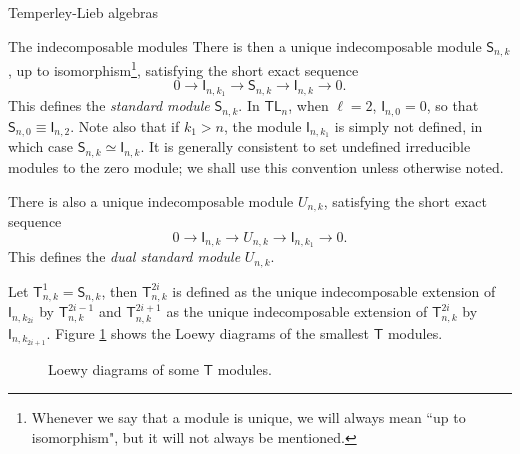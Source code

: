 \documentclass[reqno]{amsart}
\newcommand{\tl}[1]{\mathsf{TL}_{#1}}
\newcommand{\ds}[1]{\mathsf S_{#1}}
\newcommand{\dl}[1]{\mathsf I_{#1}}
\newcommand{\U}[1]{U_{#1}}
\newcommand{\T}[2]{\mathsf{T}^{#1}_{#2}}
\begin{document}
\begin{section}{Temperley-Lieb algebras}
\begin{subsection}{The indecomposable modules}
There is then a unique indecomposable module $\ds{n,k}$, up to isomorphism\footnote{Whenever we say that a module is unique, we will always mean ``up to isomorphism", but it will not always be mentioned.}, satisfying the short exact sequence
\begin{equation}
0 \longrightarrow \dl{n,k_{1}} \longrightarrow \ds{n,k} \longrightarrow \dl{n,k} \longrightarrow 0.
\end{equation} 
This defines the \emph{standard module} $\ds{n,k}$. In $\tl{n}$, when $\ell =2$, $\dl{n,0}=0$, so that $\ds{n,0}\equiv \dl{n,2}$. Note also that if $k_{1}>n$, the module $\dl{n,k_{1}}$ is simply not defined, in which case $\ds{n,k} \simeq \dl{n,k}$. It is generally consistent to set undefined irreducible modules to the zero module; we shall use this convention unless otherwise noted.

There is also a unique indecomposable module $\U{n,k}$, satisfying the short exact sequence
\begin{equation}
0 \longrightarrow \dl{n,k} \longrightarrow \U{n,k} \longrightarrow \dl{n,k_{1}} \longrightarrow 0.
\end{equation} 
This defines the \emph{dual standard module} $\U{n,k}$.

Let $\T{1}{n,k}= \ds{n,k}$, then $\T{2i}{n,k}$ is defined as the unique indecomposable extension of $\dl{n,k_{2i}}$ by $\T{2i-1}{n,k}$ and $\T{2i+1}{n,k}$ as the unique indecomposable extension of $\T{2i}{n,k}$ by $\dl{n,k_{2i+1}}$. Figure \ref{fig:LoewyofT} shows the Loewy diagrams of the smallest $\mathsf{T}$ modules.
\begin{figure}[h]
\caption{Loewy diagrams of some $\mathsf{T}$ modules.}\label{fig:LoewyofT}
\qquad
{}\qquad
{}
\end{figure}


\end{subsection}
\end{section}
\end{document}
